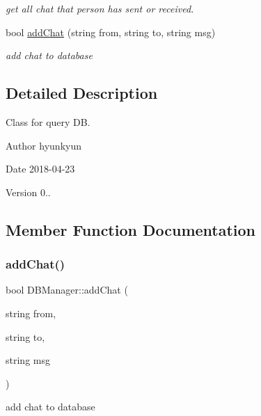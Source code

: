 \begin{DoxyCompactItemize}
\begin{DoxyCompactList}\small\item\em get all chat that person has sent or received. \end{DoxyCompactList}\item 
bool \mbox{\hyperlink{class_d_b_manager_a3631eb2172602412ceeb8f9608406aec}{add\+Chat}} (string from, string to, string msg)
\begin{DoxyCompactList}\small\item\em add chat to database \end{DoxyCompactList}\end{DoxyCompactItemize}


\subsection{Detailed Description}
Class for query DB. 

\begin{DoxyAuthor}{Author}
hyunkyun 
\end{DoxyAuthor}
\begin{DoxyDate}{Date}
2018-\/04-\/23 
\end{DoxyDate}
\begin{DoxyVersion}{Version}
0.. 
\end{DoxyVersion}


\subsection{Member Function Documentation}
\mbox{\label{class_d_b_manager_a3631eb2172602412ceeb8f9608406aec}} 
\subsubsection{\texorpdfstring{add\+Chat()}{addChat()}}
{\footnotesize\ttfamily bool D\+B\+Manager\+::add\+Chat (\begin{DoxyParamCaption}\item[{string}]{from,  }\item[{string}]{to,  }\item[{string}]{msg }\end{DoxyParamCaption})}



add chat to database 


